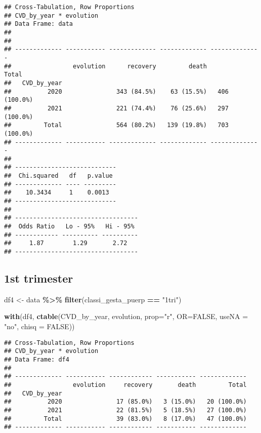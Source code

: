 \documentclass[
]{article}
\newenvironment{Shaded}{\begin{snugshade}}{\end{snugshade}}
\newcommand{\AttributeTok}[1]{\textcolor[rgb]{0.13,0.29,0.53}{#1}}
\newcommand{\ConstantTok}[1]{\textcolor[rgb]{0.56,0.35,0.01}{#1}}
\newcommand{\FunctionTok}[1]{\textcolor[rgb]{0.13,0.29,0.53}{\textbf{#1}}}
\newcommand{\NormalTok}[1]{#1}
\newcommand{\OtherTok}[1]{\textcolor[rgb]{0.56,0.35,0.01}{#1}}
\newcommand{\SpecialCharTok}[1]{\textcolor[rgb]{0.81,0.36,0.00}{\textbf{#1}}}
\newcommand{\StringTok}[1]{\textcolor[rgb]{0.31,0.60,0.02}{#1}}
\begin{document}
\begin{verbatim}
## Cross-Tabulation, Row Proportions  
## CVD_by_year * evolution  
## Data Frame: data  
## 
## 
## ------------- ----------- ------------- ------------- --------------
##                 evolution      recovery         death          Total
##   CVD_by_year                                                       
##          2020               343 (84.5%)    63 (15.5%)   406 (100.0%)
##          2021               221 (74.4%)    76 (25.6%)   297 (100.0%)
##         Total               564 (80.2%)   139 (19.8%)   703 (100.0%)
## ------------- ----------- ------------- ------------- --------------
## 
## ----------------------------
##  Chi.squared   df   p.value 
## ------------- ---- ---------
##    10.3434     1    0.0013  
## ----------------------------
## 
## ----------------------------------
##  Odds Ratio   Lo - 95%   Hi - 95% 
## ------------ ---------- ----------
##     1.87        1.29       2.72   
## ----------------------------------
\end{verbatim}

\hypertarget{st-trimester-8}{%
\subsection{1st trimester}\label{st-trimester-8}}

\begin{Shaded}
\begin{Highlighting}[]
\NormalTok{df4 }\OtherTok{\textless{}{-}}\NormalTok{ data }\SpecialCharTok{\%\textgreater{}\%} 
  \FunctionTok{filter}\NormalTok{(classi\_gesta\_puerp }\SpecialCharTok{==} \StringTok{"1tri"}\NormalTok{)}

\FunctionTok{with}\NormalTok{(df4, }\FunctionTok{ctable}\NormalTok{(CVD\_by\_year, evolution, }\AttributeTok{prop=}\StringTok{"r"}\NormalTok{, }\AttributeTok{OR=}\ConstantTok{FALSE}\NormalTok{, }\AttributeTok{useNA =} \StringTok{"no"}\NormalTok{, }\AttributeTok{chisq =} \ConstantTok{FALSE}\NormalTok{))}
\end{Highlighting}
\end{Shaded}

\begin{verbatim}
## Cross-Tabulation, Row Proportions  
## CVD_by_year * evolution  
## Data Frame: df4  
## 
## ------------- ----------- ------------ ----------- -------------
##                 evolution     recovery       death         Total
##   CVD_by_year                                                   
##          2020               17 (85.0%)   3 (15.0%)   20 (100.0%)
##          2021               22 (81.5%)   5 (18.5%)   27 (100.0%)
##         Total               39 (83.0%)   8 (17.0%)   47 (100.0%)
## ------------- ----------- ------------ ----------- -------------
\end{verbatim}
\end{document}
